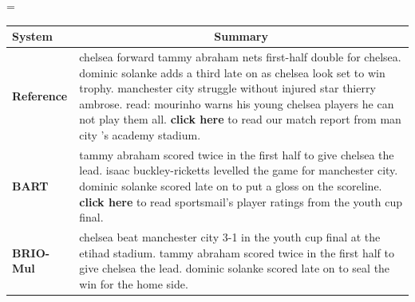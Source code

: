 \documentclass[11pt]{article}
\newcommand{\model}{BRIO\xspace}
\begin{document}
\begin{table}[t!]
    \scriptsize
    \centering
    \extrarowheight=\aboverulesep
    \addtolength{\extrarowheight}{\belowrulesep}
    \aboverulesep=0pt
    \belowrulesep=0pt
    \begin{tabular}{@{} c  p{}}
     \toprule
    \multicolumn{1}{l}{ \bf System} &  \multicolumn{1}{c}{ \bf Summary} \\\midrule
     \multicolumn{1}{l}{ \bf Reference} & \cellcolor{gray!25} chelsea forward tammy abraham nets first-half double for chelsea. dominic solanke adds a third late on as chelsea look set to win trophy. manchester city struggle without injured star thierry ambrose. read: mourinho warns his young chelsea players he can not play them all. \textbf{click here} to read our match report from man city 's academy stadium. \\
     \multicolumn{1}{l}{ \bf BART} & tammy abraham scored twice in the first half to give chelsea the lead. isaac buckley-ricketts levelled the game for manchester city. dominic solanke scored late on to put a gloss on the scoreline. \textbf{click here} to read sportsmail's player ratings from the youth cup final. \\
    \multicolumn{1}{l}{ \bf \model-Mul }& \cellcolor{gray!25} chelsea beat manchester city 3-1 in the youth cup final at the etihad stadium. tammy abraham scored twice in the first half to give chelsea the lead. dominic solanke scored late on to seal the win for the home side. \\
   

\end{tabular}
\end{table}
\end{document}

